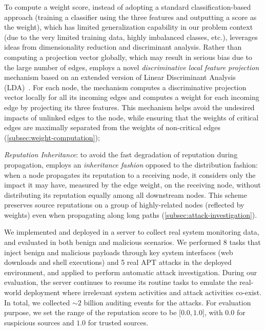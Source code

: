 To compute a weight score,
instead of adopting a standard 
classification-based approach (\ie training a classifier using the three features and outputting a score as the weight), which has limited generalization capability in our problem context (\eg due to the very limited training data, highly imbalanced classes, etc.), 
\tool leverages ideas from dimensionality reduction and discriminant analysis.
Rather than computing a projection vector globally, which may result in serious bias due to the large number of edges, 
\tool employs a novel \emph{discriminative local feature projection} mechanism based on an extended version of Linear Discriminant Analysis (LDA)~\cite{Mika99fisherdiscriminant}.
For each node, the mechanism computes a discriminative projection vector locally for all its incoming edges and computes a weight for each incoming edge by projecting its three features.
This mechanism helps avoid the undesired impacts of unlinked edges to the node, while ensuring that the weights of critical edges are maximally separated from the weights of non-critical edges (\cref{subsec:weight-computation});


\emph{Reputation Inheritance}: to avoid the fast degradation of reputation during propagation, \tool employs an \emph{inheritance fashion} opposed to the distribution fashion:
when a node propagates its reputation to a receiving node,
it considers only the impact it may have, measured by the edge weight, on the receiving node, without distributing its reputation equally among all downstream nodes. 
This scheme preserves source reputations on a group of highly-related nodes (reflected by weights) even when propagating along long paths (\cref{subsec:attack-investigation}).



We implemented and deployed \tool in a server to collect real system monitoring data,
and evaluated \tool in both benign and malicious scenarios.
We performed 8 tasks that inject benign and malicious payloads through key system interfaces (\eg web downloads and shell executions)
and 5 real APT attacks in the deployed environment,
and applied \tool to perform automatic attack investigation.
During our evaluation, the server continues to resume its routine tasks to emulate the real-world deployment where irrelevant system activities and attack activities co-exist.
In total, we collected ${\sim}2$ billion auditing events for the attacks.
For evaluation purpose, we set the range of the reputation score to be $\lbrack0.0,1.0\rbrack$, with $0.0$ for suspicious sources and $1.0$ for trusted sources.

